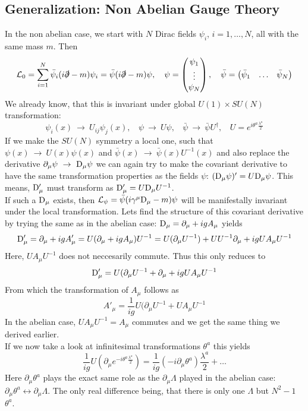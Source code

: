 \documentclass{include/thesisclass}
\newcommand{\LL}{\mathcal{L}}
\newcommand{\Dd}{{\rm D}}
\newcommand{\df}{\rightarrow}
\newcommand{\p}{\partial}
\newcommand{\vektor}[3]{\begin{pmatrix} #1 \\ #2 \\ #3 \end{pmatrix}}
\begin{document}
\subsection{Generalization: Non Abelian Gauge Theory}
In the non abelian case, we start with $N$ Dirac fields $\psi_i$, $i = 1, \ldots, N$, all with the same mass $m$. Then
\[ \LL_0 = \sum_{i = 1}^N \bar{\psi}_i ( i \slashed{\p} - m ) \psi_i = \bar{\psi}( i \slashed{\p}- m) \psi, ~~~ \psi = \vektor{\psi_1}{\vdots}{\psi_N}, ~~~ \bar{\psi} = \begin{pmatrix}\bar{\psi}_1 & \ldots & \bar{\psi}_N\end{pmatrix}\]
We already know, that this is invariant under global $U(1)\times SU(N)$ transformation:
\[ \psi_i(x) ~\df~ U_{ij} \psi_j(x), ~~~~ \psi ~\df~ U \psi, ~~~~ \bar{\psi}~\df~\bar{\psi}U^\dagger, ~~~~ U = e^{i \theta^a \frac{\lambda^a}{2}}
\]
If we make the $SU(N)$ symmetry a local one, such that $\psi(x) ~\df~ U(x) \psi(x)$ and $\bar{\psi}(x) ~\df~\bar{\psi}(x) U^{-1}(x)$ and also replace the derivative $\p_\mu \psi ~\df~ \Dd_\mu \psi$ we can again try to make the covariant derivative to have the same transformation properties as the fields $\psi$: $(\Dd_\mu \psi)' = U \Dd_\mu \psi$. This means, $\Dd'_\mu$ must transform as $\Dd'_\mu = U \Dd_\mu U^{-1}$.\\
If such a $\Dd_\mu$ exists, then $\LL_\psi = \bar{\psi}(i \gamma^\mu \Dd_\mu - m ) \psi$ will be manifestally invariant under the local transformation. Lets find the structure of this covariant derivative by trying the same as in the abelian case:
$\Dd_\mu = \p_\mu + i g A_\mu$ yields
\[\Dd'_\mu = \p_\mu + i g A'_\mu = U(\p_\mu + i gA_\mu) U^{-1} = U( \p_\mu U^{-1}) + UU^{-1} \p_\mu + i g U A_\mu U^{-1}\]
Here, $U A_\mu U^{-1}$ does not neccesarily commute. Thus this only reduces to
\[ \Dd'_\mu = U(\p_\mu U^{-1} + \p_\mu + i g U A_\mu U^{-1}\]
From which the transformation of $A_\mu$ follows as
\[ A'_\mu = \frac{1}{ig} U( \p_\mu U^{-1} + U A_\mu U^{-1}\]
In the abelian case, $U A_\mu U^{-1} = A_\mu$ commutes and we get the same thing we derived earlier.\\
If we now take a look at infinitesimal transformations $\theta^a$ this yields
\[ \frac{1}{ig} U \left( \p_\mu e^{-i \theta^a \frac{\lambda^a}{2}}\right) = \frac{1}{ig} ( -i \p_\mu \theta^a) \frac{\lambda^a}{2} + \ldots\]
Here $\p_\mu \theta^a$ plays the exact same role as the $\p_\mu \Lambda$ played in the abelian case: $\p_\mu \theta^a \leftrightarrow \p_\mu \Lambda$. The only real difference being, that there is only one $\Lambda$ but $N^2 -1$ $\theta^a$.\\
\end{document}
